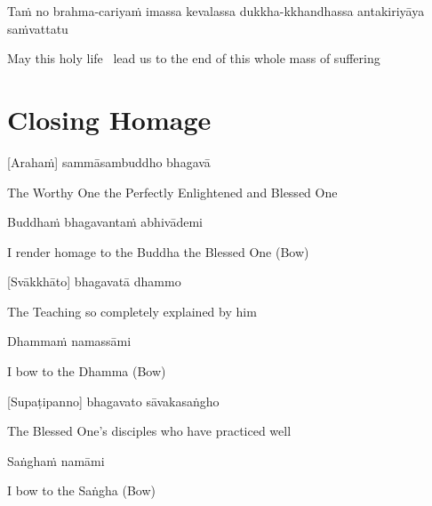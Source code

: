 \begin{pali-hang}
  Taṁ no brahma-cariyaṁ imassa kevalassa dukkha-kkhandhassa antakiriyāya saṁvattatu
\end{pali-hang}

\begin{english}
  May this holy life \breathmark\ lead us to the end of this whole mass of suffering
\end{english}


\section{Closing Homage}
\label{closing-homage}

[Arahaṁ] sammāsambuddho bhagavā

\begin{english}
  The Worthy One the Perfectly Enlightened and Blessed One
\end{english}

Buddhaṁ bhagavantaṁ abhivādemi

\begin{english}
  I render homage to the Buddha the Blessed One \hfill{(Bow)}
\end{english}

[Svākkhāto] bhagavatā dhammo

\begin{english}
  The Teaching so completely explained by him
\end{english}

Dhammaṁ namassāmi

\begin{english}
  I bow to the Dhamma \hfill{(Bow)}
\end{english}

[Supaṭipanno] bhagavato sāvakasaṅgho

\begin{english}
  The Blessed One's disciples who have practiced well
\end{english}

Saṅghaṁ namāmi

\begin{english}
  I bow to the Saṅgha \hfill{(Bow)}\\
\end{english}

\null
\vfill

